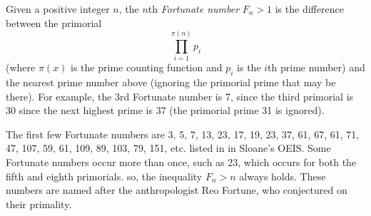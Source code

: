 \documentclass[12pt]{article}
\begin{document}
Given a positive integer $n$, the $n$th {\em Fortunate number} $F_n > 1$ is the difference between the primorial $$\prod_{i = 1}^{\pi(n)} p_i$$ (where $\pi(x)$ is the prime counting function and $p_i$ is the $i$th prime number) and the nearest prime number above (ignoring the primorial prime that may be there). For example, the 3rd Fortunate number is 7, since the third primorial is 30 since the next highest prime is 37 (the primorial prime 31 is ignored).

The first few Fortunate numbers are 3, 5, 7, 13, 23, 17, 19, 23, 37, 61, 67, 61, 71, 47, 107, 59, 61, 109, 89, 103, 79, 151, etc. listed in  in Sloane's OEIS. Some Fortunate numbers occur more than once, such as 23, which occurs for both the fifth and eighth primorials.  so, the inequality $F_n > n$ always holds. These numbers are named after the anthropologist Reo Fortune, who conjectured on their primality.

\end{document}

